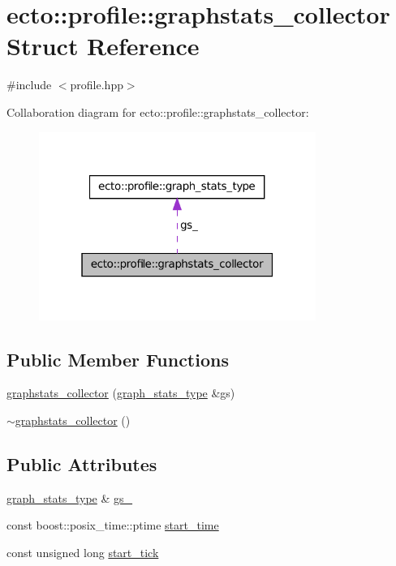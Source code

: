 \hypertarget{structecto_1_1profile_1_1graphstats__collector}{\section{ecto\-:\-:profile\-:\-:graphstats\-\_\-collector \-Struct \-Reference}
\label{structecto_1_1profile_1_1graphstats__collector}
}


{\ttfamily \#include $<$profile.\-hpp$>$}



\-Collaboration diagram for ecto\-:\-:profile\-:\-:graphstats\-\_\-collector\-:\nopagebreak
\begin{figure}[H]
\begin{center}
\leavevmode
\includegraphics[width=256pt]{structecto_1_1profile_1_1graphstats__collector__coll__graph}
\end{center}
\end{figure}
\subsection*{\-Public \-Member \-Functions}
\begin{DoxyCompactItemize}
\item 
\hyperlink{structecto_1_1profile_1_1graphstats__collector_a375c75ce1c0197d1d87a5fc1bdf97050}{graphstats\-\_\-collector} (\hyperlink{structecto_1_1profile_1_1graph__stats__type}{graph\-\_\-stats\-\_\-type} \&gs)
\item 
\hyperlink{structecto_1_1profile_1_1graphstats__collector_a1bc967dcde1e3418aeeb10e58a52d79f}{$\sim$graphstats\-\_\-collector} ()
\end{DoxyCompactItemize}
\subsection*{\-Public \-Attributes}
\begin{DoxyCompactItemize}
\item 
\hyperlink{structecto_1_1profile_1_1graph__stats__type}{graph\-\_\-stats\-\_\-type} \& \hyperlink{structecto_1_1profile_1_1graphstats__collector_a4a6ceeeffacb5f69edc173d5aaf3cf89}{gs\-\_\-}
\item 
const boost\-::posix\-\_\-time\-::ptime \hyperlink{structecto_1_1profile_1_1graphstats__collector_a85cb67d72c9d1072634b879776e2e4b8}{start\-\_\-time}
\item 
const unsigned long \hyperlink{structecto_1_1profile_1_1graphstats__collector_a7a840b075fd490da5107ea538614d017}{start\-\_\-tick}
\end{DoxyCompactItemize}


